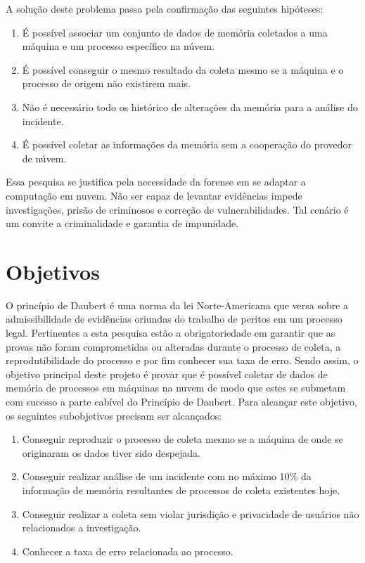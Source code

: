 \documentclass[12pt,				%
	openright,			%
	oneside,			%
	a4paper,			%
	english,			%
	brazil				%
	]{abntex2}
\begin{document}
A solução deste problema passa pela confirmação das seguintes hipóteses:

\begin{enumerate}
 \item É possível associar um conjunto de dados de memória coletados a uma máquina e um processo específico na núvem.
 \item É possível conseguir o mesmo resultado da coleta mesmo se a máquina e o processo de origem não existirem mais.
 \item Não é necessário todo os histórico de alterações da memória para a análise do incidente.
 \item É possível coletar as informações da memória sem a cooperação do provedor de núvem.
\end{enumerate}

Essa pesquisa se justifica pela necessidade da forense em se adaptar a computação em nuvem. Não ser capaz de levantar evidências impede investigações, prisão de criminosos e 
correção de vulnerabilidades. Tal cenário é um convite a criminalidade e garantia de impunidade.

\chapter{Objetivos} \label{chap:obj}
O princípio de Daubert é uma norma da lei Norte-Americana que versa sobre a admissibilidade de evidências oriundas do trabalho de peritos em um processo legal. Pertinentes a
esta pesquisa estão a obrigatoriedade em garantir que as provas não foram comprometidas ou alteradas durante o processo de coleta, a reprodutibilidade do processo e
por fim conhecer sua taxa de erro. Sendo assim, o objetivo principal deste projeto é provar que é possível coletar de dados de memória de processos em 
máquinas na nuvem de modo que estes se submetam com sucesso a parte cabível do Princípio de Daubert. Para alcançar este objetivo, os seguintes subobjetivos precisam ser alcançados:

\begin{enumerate}
 \item Conseguir reproduzir o processo de coleta mesmo se a máquina de onde se originaram os dados tiver sido despejada.
 \item Conseguir realizar análise de um incidente com no máximo 10\% da informação de memória resultantes de processos de coleta existentes hoje.
 \item Conseguir realizar a coleta sem violar jurisdição e privacidade de usuários não relacionados a investigação.
 \item Conhecer a taxa de erro relacionada ao processo.
\end{enumerate}
\end{document}
